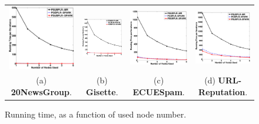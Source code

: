 \documentclass[10pt, conference, compsocconf]{IEEEtran}
\begin{document}
\begin{figure}[tb]
\begin{center}
\begin{tabular}{cccc}
   \includegraphics[height=4.cm,width=4.5cm]{img/20NewsGroup_time.eps}&
   \hspace{-0.6cm}\includegraphics[height=4.cm,width=4.5cm]{img/Gisette_time.eps}&
   \hspace{-0.6cm}\includegraphics[height=4.cm,width=4.5cm]{img/ECUESpam_time.eps}&
   \hspace{-0.6cm}\includegraphics[height=4.cm,width=4.5cm]{img/URL-Reputation_time.eps}\\
   (a) \textbf{20NewsGroup}. & \hspace{-0.3cm}(b) \textbf{Gisette}. & \hspace{-0.3cm}(c) \textbf{ECUESpam}. & \hspace{-0.3cm}(d) \textbf{URL-Reputation}.\\
   \end{tabular}
\end{center}\vspace{-0.4cm}
   \caption{Running time, as a function of used node number.}\vspace{-0.5cm}
\label{fig:time}
\end{figure}
%
\end{document}
